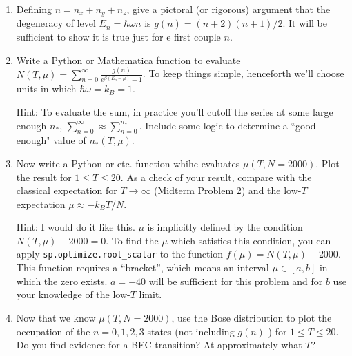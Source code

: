\documentclass[10pt]{article}
\begin{document}
	\begin{enumerate}[label=\alph*)]
		\item Defining \( n = n_x + n_y + n_z \), give a pictoral (or rigorous) argument that the degeneracy of 
			level \( E_n = \hbar \omega n \) is \( g(n) = (n+2)(n+1) / 2 \). It will be sufficient to show it 
			is true just for e first couple \( n \). 
			\item Write a Python or Mathematica function to evaluate \( N(T, \mu) = \sum_{n = 0}^\infty 
			\frac{g(n)}{e^{\beta(E_n - \mu)} - 1}\). To keep things simple, henceforth we'll choose units in 
			which \( \hbar \omega = k_B = 1 \). 

			Hint: To evaluate the sum, in practice you'll cutoff the series at some large enough \( n_{*} \), 
			\( \sum_{n= 0}^{\infty} \approx \sum_{n = 0}^{n_*} \). Include some logic to 
			determine a ``good enough" value of \( n_*(T, \mu) \). 
		\item Now write a Python or etc. function whihc evaluates \( \mu(T, N = 2000) \). Plot the result for 
			\( 1 \le  T \le  20 \). As a check of your result, compare with the classical expectation for 
			 \( T \to \infty \) (Midterm Problem 2) and the low-\( T \) expectation \( \mu \approx -k_BT / N \).

			 Hint: I would do it like this. \( \mu \) is implicitly defined by the condition \( N(T, \mu) - 2000
			  = 0\). To find the \( \mu \) which satisfies this condition, you can apply 
			  \texttt{sp.optimize.root\_scalar} to the function \( f(\mu) = N(T, \mu) - 2000 \). This 
			  function requires a ``bracket'', which means an interval \( \mu \in [a, b] \) in which the 
			  zero exists. \( a = -40 \) will be sufficient for this problem and for \( b \) use your 
			  knowledge of the low-\( T \) limit. 
		  \item Now that we know \( \mu(T, N = 2000) \), use the Bose distribution to plot the occupation of the 
			  \( n = 0, 1, 2, 3 \) states (not including \( g(n) \) ) for \( 1 \le  T \le 20 \). Do you find 
			  evidence for a BEC transition? At approximately what \( T \)? 
	\end{enumerate}
\end{document}
